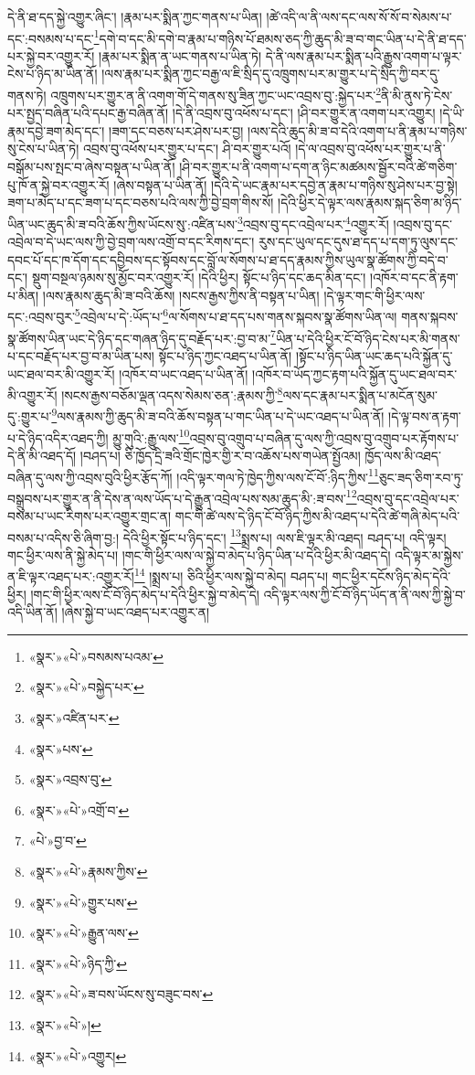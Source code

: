 དེ་ནི་ཐ་དད་སྐྱེ་འགྱུར་ཞིང་། །རྣམ་པར་སྨིན་ཀྱང་གནས་པ་ཡིན། །ཚེ་འདི་ལ་ནི་ལས་དང་ལས་སོ་སོ་བ་སེམས་པ་དང་:བསམས་པ་དང་\footnote{«སྣར་»«པེ་»བསམས་པའམ་}དགེ་བ་དང་མི་དགེ་བ་རྣམ་པ་གཉིས་པོ་ཐམས་ཅད་ཀྱི་ཆུད་མི་ཟ་བ་གང་ཡིན་པ་དེ་ནི་ཐ་དད་པར་སྐྱེ་བར་འགྱུར་རོ། །རྣམ་པར་སྨིན་ན་ཡང་གནས་པ་ཡིན་ཏེ། དེ་ནི་ལས་རྣམ་པར་སྨིན་པའི་རྒྱུས་འགག་པ་ལྟར་ངེས་པ་ཉིད་མ་ཡིན་ནོ། །ལས་རྣམ་པར་སྨིན་ཀྱང་བརྒྱ་ལ་ཇི་སྲིད་དུ་འཁྲུགས་པར་མ་གྱུར་པ་དེ་སྲིད་ཀྱི་བར་དུ་གནས་ཏེ། འཁྲུགས་པར་གྱུར་ན་ནི་འགག་གོ་དེ་གནས་སུ་ཟིན་ཀྱང་ཡང་འབྲས་བུ་:སྐྱེད་པར་\footnote{«སྣར་»«པེ་»བསྐྱེད་པར་}ནི་མི་ནུས་ཏེ་ངེས་པར་སྤྱད་བཞིན་པའི་དཔང་རྒྱ་བཞིན་ནོ། །དེ་ནི་འབྲས་བུ་འཕོས་པ་དང་། །ཤི་བར་གྱུར་ན་འགག་པར་འགྱུར། །དེ་ཡི་རྣམ་དབྱེ་ཟག་མེད་དང་། །ཟག་དང་བཅས་པར་ཤེས་པར་བྱ། །ལས་དེའི་ཆུད་མི་ཟ་བ་དེའི་འགག་པ་ནི་རྣམ་པ་གཉིས་སུ་ངེས་པ་ཡིན་ཏེ། འབྲས་བུ་འཕོས་པར་གྱུར་པ་དང་། ཤི་བར་གྱུར་པའོ། །དེ་ལ་འབྲས་བུ་འཕོས་པར་གྱུར་པ་ནི་བསྒོམ་པས་སྤང་བ་ཞེས་བསྟན་པ་ཡིན་ནོ། །ཤི་བར་གྱུར་པ་ནི་འགག་པ་དག་ན་ཉིང་མཚམས་སྦྱོར་བའི་ཚེ་གཅིག་པུ་ཁོ་ན་སྐྱེ་བར་འགྱུར་རོ། །ཞེས་བསྟན་པ་ཡིན་ནོ། །དེའི་དེ་ཡང་རྣམ་པར་དབྱེ་ན་རྣམ་པ་གཉིས་སུ་ཤེས་པར་བྱ་སྟེ། ཟག་པ་མེད་པ་དང་ཟག་པ་དང་བཅས་པའི་ལས་ཀྱི་བྱེ་བྲག་གིས་སོ། །དེའི་ཕྱིར་དེ་ལྟར་ལས་རྣམས་སྐད་ཅིག་མ་ཉིད་ཡིན་ཡང་ཆུད་མི་ཟ་བའི་ཆོས་ཀྱིས་ཡོངས་སུ་:འཛིན་པས་\footnote{«སྣར་»འཛིན་པར་}འབྲས་བུ་དང་འབྲེལ་པར་\footnote{«སྣར་»པས་}འགྱུར་རོ། །འབྲས་བུ་དང་འབྲེལ་བ་དེ་ཡང་ལས་ཀྱི་བྱེ་བྲག་ལས་འགྲོ་བ་དང་རིགས་དང་། རུས་དང་ཡུལ་དང་དུས་ཐ་དད་པ་དག་ཏུ་ལུས་དང་དབང་པོ་དང་ཁ་དོག་དང་དབྱིབས་དང་སྟོབས་དང་བློ་ལ་སོགས་པ་ཐ་དད་རྣམས་ཀྱིས་ཡུལ་སྣ་ཚོགས་ཀྱི་བདེ་བ་དང་། སྡུག་བསྔལ་ཉམས་སུ་མྱོང་བར་འགྱུར་རོ། །དེའི་ཕྱིར། སྟོང་པ་ཉིད་དང་ཆད་མིན་དང་། །འཁོར་བ་དང་ནི་རྟག་པ་མིན། །ལས་རྣམས་ཆུད་མི་ཟ་བའི་ཆོས། །སངས་རྒྱས་ཀྱིས་ནི་བསྟན་པ་ཡིན། །དེ་ལྟར་གང་གི་ཕྱིར་ལས་དང་:འབྲས་བུར་\footnote{«སྣར་»འབྲས་བུ་}འབྲེལ་པ་དེ་:ཡོད་པ་\footnote{«སྣར་»«པེ་»འགྲོ་བ་}ལ་སོགས་པ་ཐ་དད་པས་གནས་སྐབས་སྣ་ཚོགས་ཡིན་ལ། གནས་སྐབས་སྣ་ཚོགས་ཡིན་ཡང་དེ་ཉིད་དང་གཞན་ཉིད་དུ་བརྗོད་པར་:བྱ་བ་མ་\footnote{«པེ་»བྱ་བ་}ཡིན་པ་དེའི་ཕྱིར་ངོ་བོ་ཉིད་ངེས་པར་མི་གནས་པ་དང་བརྗོད་པར་བྱ་བ་མ་ཡིན་པས། སྟོང་པ་ཉིད་ཀྱང་འཐད་པ་ཡིན་ནོ། །སྟོང་པ་ཉིད་ཡིན་ཡང་ཆད་པའི་སྐྱོན་དུ་ཡང་ཐལ་བར་མི་འགྱུར་རོ། །འཁོར་བ་ཡང་འཐད་པ་ཡིན་ནོ། །འཁོར་བ་ཡོད་ཀྱང་རྟག་པའི་སྐྱོན་དུ་ཡང་ཐལ་བར་མི་འགྱུར་རོ། །སངས་རྒྱས་བཅོམ་ལྡན་འདས་སེམས་ཅན་:རྣམས་ཀྱི་\footnote{«སྣར་»«པེ་»རྣམས་ཀྱིས་}ལས་དང་རྣམ་པར་སྨིན་པ་མངོན་སུམ་དུ་:གྱུར་པ་\footnote{«སྣར་»«པེ་»གྱུར་པས་}ལས་རྣམས་ཀྱི་ཆུད་མི་ཟ་བའི་ཆོས་བསྟན་པ་གང་ཡིན་པ་དེ་ཡང་འཐད་པ་ཡིན་ནོ། །དེ་ལྟ་བས་ན་རྟག་པ་དེ་ཉིད་འདིར་འཐད་ཀྱི། མྱུ་གུའི་:རྒྱུ་ལས་\footnote{«སྣར་»«པེ་»རྒྱུན་ལས་}འབྲས་བུ་འགྲུབ་པ་བཞིན་དུ་ལས་ཀྱི་འབྲས་བུ་འགྲུབ་པར་རྟོགས་པ་དེ་ནི་མི་འཐད་དོ། །བཤད་པ། ཅི་ཁྱོད་དྲི་ཟའི་གྲོང་ཁྱེར་གྱི་ར་བ་འཆོས་པས་གཡེན་སྤྱོའམ། ཁྱོད་ལས་མི་འཐད་བཞིན་དུ་ལས་ཀྱི་འབྲས་བུའི་ཕྱིར་རྩོད་ཀོ། །འདི་ལྟར་གལ་ཏེ་ཁྱེད་ཀྱིས་ལས་ངོ་བོ་:ཉིད་ཀྱིས་\footnote{«སྣར་»«པེ་»ཉིད་ཀྱི་}ཅུང་ཟད་ཅིག་རབ་ཏུ་བསྒྲུབས་པར་གྱུར་ན་ནི་དེས་ན་ལས་ཡོད་པ་དེ་རྒྱུན་འབྲེལ་པས་སམ་ཆུད་མི་:ཟ་བས་\footnote{«སྣར་»«པེ་»ཟ་བས་ཡོངས་སུ་བཟུང་བས་}འབྲས་བུ་དང་འབྲེལ་པར་བསམ་པ་ཡང་རིགས་པར་འགྱུར་གྲང་ན། གང་གི་ཚེ་ལས་དེ་ཉིད་ངོ་བོ་ཉིད་ཀྱིས་མི་འཐད་པ་དེའི་ཚེ་གཞི་མེད་པའི་བསམ་པ་འདིས་ཅི་ཞིག་བྱ:། དེའི་ཕྱིར་སྟོང་པ་ཉིད་དང་། \footnote{«སྣར་»«པེ་»།  }སྨྲས་པ། ལས་ཇི་ལྟར་མི་འཐད། བཤད་པ། འདི་ལྟར། གང་ཕྱིར་ལས་ནི་སྐྱེ་མེད་པ། །གང་གི་ཕྱིར་ལས་ལ་སྐྱེ་བ་མེད་པ་ཉིད་ཡིན་པ་དེའི་ཕྱིར་མི་འཐད་དེ། འདི་ལྟར་མ་སྐྱེས་ན་ཇི་ལྟར་འཐད་པར་:འགྱུར་རོ།\footnote{«སྣར་»«པེ་»འགྱུར།} །སྨྲས་པ། ཅིའི་ཕྱིར་ལས་སྐྱེ་བ་མེད། བཤད་པ། གང་ཕྱིར་དངོས་ཉིད་མེད་དེའི་ཕྱིར། །གང་གི་ཕྱིར་ལས་ངོ་བོ་ཉིད་མེད་པ་དེའི་ཕྱིར་སྐྱེ་བ་མེད་དེ། འདི་ལྟར་ལས་ཀྱི་ངོ་བོ་ཉིད་ཡོད་ན་ནི་ལས་ཀྱི་སྐྱེ་བ་འདི་ཡིན་ནོ། །ཞེས་སྐྱེ་བ་ཡང་འཐད་པར་འགྱུར་ན། 